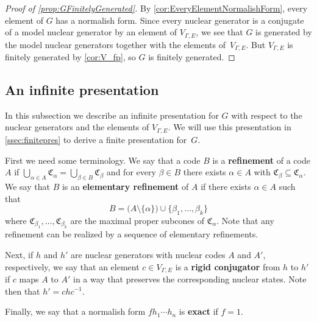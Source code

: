 \documentclass[11pt,letterpaper]{amsart}
\theoremstyle{definition}
\newcommand{\newword}[1]{\textbf{#1}}
\newcommand{\C}{\mathfrak{C}}
\begin{document}
\begin{proof}[Proof of \cref{prop:GFinitelyGenerated}]
By \cref{cor:EveryElementNormalishForm}, every element of $G$ has a normalish form.  Since every nuclear generator is a conjugate of a model nuclear generator by an element of $V_{\Gamma,E}$, we see that $G$ is generated by the model nuclear generators together with the elements of~$V_{\Gamma,E}$. But $V_{\Gamma,E}$ is finitely generated by \cref{cor:V_fp}, so $G$ is finitely generated.
\end{proof}

\subsection{An infinite presentation}\label{ssec:infinitepres}

In this subsection we describe an infinite presentation for $G$ with respect to the nuclear generators and the elements of $V_{\Gamma,E}$. We will use this presentation in \cref{ssec:finitepres} to derive a finite presentation for~$G$.

First we need some terminology. We say that a code $B$ is a \newword{refinement} of a code $A$ if $\bigcup_{\alpha\in A}\C_\alpha=\bigcup_{\beta\in B}\C_\beta$ and for every $\beta\in B$ there exists $\alpha\in A$ with $\C_\beta\subseteq \C_\alpha$.  We say that $B$ is an \newword{elementary refinement} of $A$ if there exists $\alpha\in A$ such that
\[
B = \bigl(A\setminus\{\alpha\}\big) \cup \{\beta_1,\ldots,\beta_k\}
\]
where $\C_{\beta_1},\ldots,\C_{\beta_k}$ are the maximal proper subcones of $\C_\alpha$.  Note that any refinement can be realized by a sequence of elementary refinements.

Next, if $h$ and $h'$ are nuclear generators with nuclear codes $A$ and $A'$, respectively, we say that an element $c\in V_{\Gamma,E}$ is a \newword{rigid conjugator} from $h$ to $h'$ if $c$ maps $A$ to $A'$ in a way that preserves the corresponding nuclear states.  Note then that $h'=chc^{-1}$.

Finally, we say that a normalish form $fh_1\cdots h_n$ is \newword{exact} if $f=1$.
\end{document}
